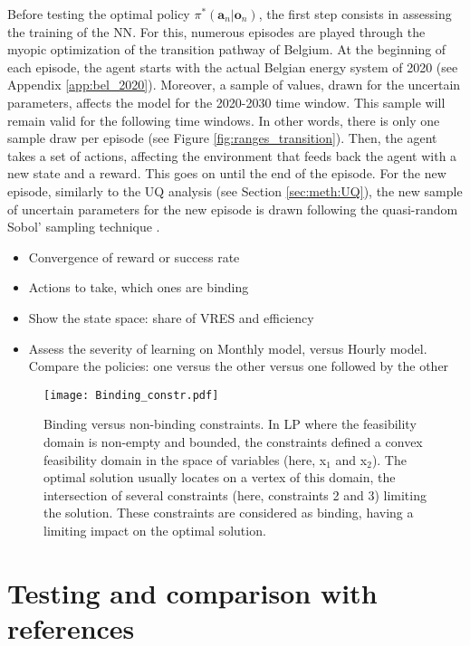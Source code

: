 Before testing the optimal policy $\pi^*\left(\bm{a}_n | \bm{o}_n\right)$, the first step consists in assessing the training of the \gls{NN}. For this, numerous episodes are played through the myopic optimization of the transition pathway of Belgium. At the beginning of each episode, the agent starts with the actual Belgian energy system of 2020 (see Appendix \ref{app:bel_2020}). Moreover, a sample of values, drawn for the uncertain parameters, affects the model for the 2020-2030 time window. This sample will remain valid for the following time windows. In other words, there is only one sample draw per episode (see Figure \ref{fig:ranges_transition}).  Then, the agent takes a set of actions, affecting the environment that feeds back the agent with a new state and a reward. This goes on until the end of the episode. For the new episode, similarly to the \gls{UQ} analysis (see Section \ref{sec:meth:UQ}), the new sample of uncertain parameters for the new episode is drawn following the quasi-random Sobol' sampling technique \cite{bratley2003implementing}.



\begin{itemize}
\item Convergence of reward or success rate
\item Actions to take, which ones are binding
\item Show the state space: share of \gls{VRES} and efficiency
\item Assess the severity of learning on Monthly model, versus Hourly model. Compare the policies: one versus the other versus one followed by the other
\end{itemize}

\begin{figure}[!htbp]
\centering
\texttt{[image: Binding\_constr.pdf]}
\caption{Binding versus non-binding constraints. In \gls{LP} where the feasibility domain is non-empty and bounded, the constraints defined a convex feasibility domain in the space of variables (here, x$_1$ and x$_2$). The optimal solution usually locates on a vertex of this domain, \ie the intersection of several constraints (here, constraints 2 and 3) limiting the solution. These constraints are considered as binding, \ie having a limiting impact on the optimal solution.}
\label{fig:Reward}
\end{figure} 


\section{Testing and comparison with references}
\label{sec:RL:testing}

